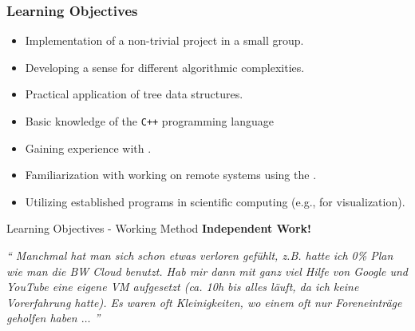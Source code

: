 \begin{frame}
  \frametitle{Learning Objectives}
  \begin{itemize}
    \item Implementation of a non-trivial project in a small group.
    \item Developing a sense for different algorithmic complexities.
    \item Practical application of tree data structures.
    \item Basic knowledge of the \texttt{C++} programming language
    \item Gaining experience with .
    \item Familiarization with working on remote systems using the .
    \item Utilizing established programs in scientific computing (e.g.,  for visualization).
  \end{itemize}
\end{frame}

\begin{frame}{Learning Objectives - Working Method}
\centering
{\Large\textbf{Independent Work!}}

\vfill
\pause
\textit{\enquote{%
    Manchmal hat man sich schon etwas verloren gefühlt, z.B. hatte ich 0\% Plan wie man die BW Cloud benutzt. Hab mir dann mit ganz viel Hilfe von Google und YouTube eine eigene VM aufgesetzt (ca. 10h bis alles läuft, da ich keine Vorerfahrung hatte). Es waren oft Kleinigkeiten, wo einem oft nur Foreneinträge geholfen haben $\dots$%
}}

\vfill

\end{frame}

